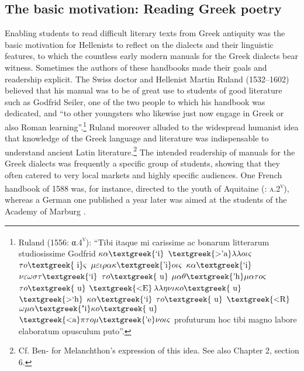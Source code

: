 \subsection{The basic motivation: Reading Greek poetry}
\hypertarget{Toc19704819}{}
Enabling students to read difficult literary texts from Greek antiquity was the basic motivation for Hellenists to reflect on the dialects and their linguistic features, to which the countless early modern manuals for the Greek dialects bear witness. Sometimes the authors of these handbooks made their goals and readership explicit. The Swiss doctor and Hellenist Martin Ruland (1532–1602) believed that his manual was to be of great use to students of good literature such as Godfrid Seiler, one of the two people to which his handbook was dedicated, and “to other youngsters who likewise just now engage in Greek or also Roman learning”.\footnote{Ruland (1556: α.4\textsc{\textsuperscript{v}}): “Tibi itaque mi carissime ac bonarum litterarum studiosissime Godfrid $\kappa \alpha \text{\textgreek{`i}}$ $\text{\textgreek{>'a}}\lambda \lambda o\iota \varsigma $ $\tau o\text{\textgreek{~i}}\varsigma $ $\mu \varepsilon \iota \rho \alpha \kappa \text{\textgreek{'i}}o\iota \varsigma $ $\kappa \alpha \text{\textgreek{`i}}$ $\nu \varepsilon \omega \sigma \tau \text{\textgreek{`i}}$ $\tau o\text{\textgreek{~u}}$ $\mu \alpha \theta \text{\textgreek{'h}}\mu \alpha \tau o\varsigma $ $\tau o\text{\textgreek{~u}}$ $\text{\textgreek{<E}}$$\lambda \lambda \eta \nu \iota \kappa o\text{\textgreek{~u}}$ $\text{\textgreek{>`h}}$ $\kappa \alpha \text{\textgreek{`i}}$ $\tau o\text{\textgreek{~u}}$ $\text{\textgreek{<R}}$$\omega \mu \alpha \text{\textgreek{"i}}\kappa o\text{\textgreek{~u}}$ $\text{\textgreek{<a}}\pi \tau o\mu \text{\textgreek{'e}}\nu o\iota \varsigma $ profuturum hoc tibi magno labore elaboratum opusculum puto”.} Ruland moreover alluded to the widespread humanist idea that knowledge of the Greek language and literature was indispensable to understand ancient Latin literature.\footnote{Cf. Ben-\citet[139]{Tov2009} for Melanchthon’s expression of this idea. See also Chapter 2, section 6.} The intended readership of manuals for the Greek dialects was frequently a specific group of students, showing that they often catered to very local markets and highly specific audiences. One French handbook of 1588 was, for instance, directed to the youth of Aquitaine (\citealt{Baile1588}: \textsc{a.2}\textsc{\textsuperscript{v}}), whereas a German one published a year later was aimed at the students of the Academy of Marburg \citep{Walper1589}.


